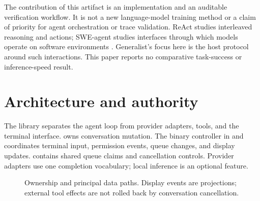 \documentclass[10pt,letterpaper]{article}
\begin{document}
The contribution of this artifact is an implementation and an auditable
verification workflow. It is not a new language-model training method or a
claim of priority for agent orchestration or trace validation. ReAct studies
interleaved reasoning and actions; SWE-agent studies interfaces through which
models operate on software environments \cite{yao2023react,yang2024sweagent}.
Generalist's focus here is the host protocol around such interactions. This
paper reports no comparative task-success or inference-speed result.

\section{Architecture and authority}
The library separates the agent loop from provider adapters, tools, and the
terminal interface.  owns conversation mutation. The binary
controller in  and  coordinates terminal input,
permission events, queue changes, and display updates. 
contains shared queue claims and cancellation controls. Provider adapters use
one completion vocabulary; local inference is an optional feature.

\begin{figure}[ht]
\centering
{}
\caption{Ownership and principal data paths. Display events are projections;
external tool effects are not rolled back by conversation cancellation.}
\label{fig:architecture}
\end{figure}
\end{document}

